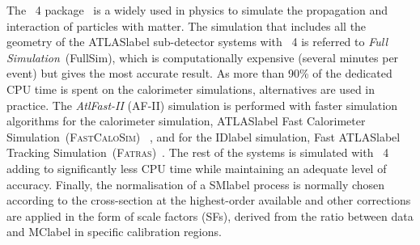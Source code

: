 The \GEANT~4 package~\cite{AGOSTINELLI2003250} is a widely used in physics to simulate the propagation and interaction of particles with matter. The simulation that includes all the geometry of the \acrshort{ATLASlabel} sub-detector systems with \GEANT~4 is referred to \textit{Full Simulation}~(FullSim), which is computationally expensive (several minutes per event) but gives the most accurate result. As more than 90\% of the dedicated CPU time is spent on the calorimeter simulations, alternatives are used in practice. The \textit{AtlFast-II} (AF-II) simulation is performed with faster simulation algorithms for the calorimeter simulation, \acrshort{ATLASlabel} Fast Calorimeter Simulation~(\textsc{FastCaloSim})~\cite{ATLAS:1300517}
, and for the \acrshort{IDlabel} simulation, Fast \acrshort{ATLASlabel} Tracking Simulation~(\textsc{Fatras})~\cite{Edmonds:1091969}. The rest of the systems is simulated with \GEANT~4 adding to significantly less CPU time while maintaining an adequate level of accuracy. Finally, the normalisation of a \acrshort{SMlabel} process is normally chosen according to the cross-section at the highest-order available and other corrections are applied in the form of scale factors (SFs), derived from the ratio between data and \acrshort{MClabel} in specific calibration regions.